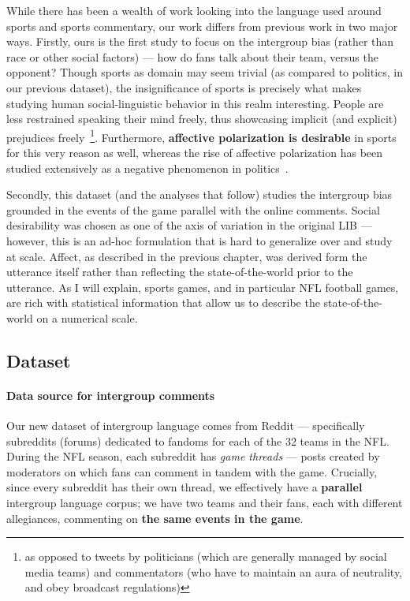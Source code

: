While there has been a wealth of work looking into the language used around sports and sports commentary, our work differs from previous work in two major ways. Firstly, ours is the first study to focus on the intergroup bias (rather than race or other social factors) --- how do fans talk about their team, versus the opponent? Though sports as domain may seem trivial (as compared to politics, in our previous dataset), the insignificance of sports is precisely what makes studying human social-linguistic behavior in this realm interesting. People are less restrained speaking their mind freely, thus showcasing implicit (and explicit) prejudices freely~\footnote{as opposed to tweets by politicians (which are generally managed by social media teams) and commentators (who have to maintain an aura of neutrality, and obey broadcast regulations)}. Furthermore, \textbf{affective polarization is desirable} in sports for this very reason as well, whereas the rise of affective polarization has been studied extensively as a negative phenomenon in politics~\citep{iyengar_origins_2019}.


Secondly, this dataset (and the analyses that follow) studies the intergroup bias grounded in the events of the game parallel with the online comments. Social desirability was chosen as one of the axis of variation in the original LIB --- however, this is an ad-hoc formulation that is hard to generalize over and study at scale. Affect, as described in the previous chapter, was derived form the utterance itself rather than reflecting the state-of-the-world prior to the utterance. As I will explain, sports games, and in particular NFL football games, are rich with statistical information that allow us to describe the state-of-the-world on a numerical scale.

\subsection{Dataset} 

\paragraph{Data source for intergroup comments} Our new dataset of intergroup language comes from Reddit --- specifically subreddits (forums) dedicated to fandoms for each of the 32 teams in the NFL. During the NFL season, each subreddit has \emph{game threads} --- posts created by moderators on which fans can comment in tandem with the game. Crucially, since every subreddit has their own thread, we effectively have a \textbf{parallel} intergroup language corpus; we have two teams and their fans, each with different allegiances, commenting on \textbf{the same events in the game}. 

